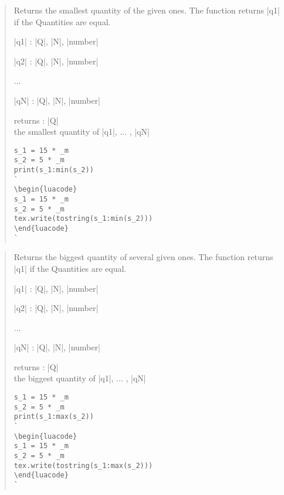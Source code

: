 \documentclass{ltxdoc}
\begin{document}
\begin{quote}
  Returns the smallest quantity of the given ones. The function returns |q1| if the Quantities are equal.

  \begin{description}
  \item |q1| : |Q|, |N|, |number|

  \item |q2| : |Q|, |N|, |number|

  \item ...

  \item |qN| : |Q|, |N|, |number|\\

  \item returns : |Q|\\
    the smallest quantity of |q1|, ... , |qN|
  \end{description}


\begin{lstlisting}
s_1 = 15 * _m
s_2 = 5 * _m
print(s_1:min(s_2))
`
\begin{luacode}
s_1 = 15 * _m
s_2 = 5 * _m
tex.write(tostring(s_1:min(s_2)))
\end{luacode}
`
\end{lstlisting}
\end{quote}


\begin{quote}
  Returns the biggest quantity of several given ones. The function returns |q1| if the Quantities are equal.

  \begin{description}
  \item |q1| : |Q|, |N|, |number|

  \item |q2| : |Q|, |N|, |number|

  \item ...

  \item |qN| : |Q|, |N|, |number|\\

  \item returns : |Q|\\
    the biggest quantity of |q1|, ... , |qN|
  \end{description}


\begin{lstlisting}
s_1 = 15 * _m
s_2 = 5 * _m
print(s_1:max(s_2))
`
\begin{luacode}
s_1 = 15 * _m
s_2 = 5 * _m
tex.write(tostring(s_1:max(s_2)))
\end{luacode}
`
\end{lstlisting}
\end{quote}
\end{document}
